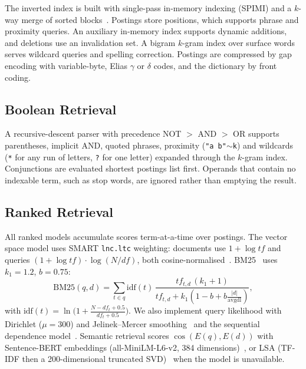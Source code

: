 \documentclass[conference]{IEEEtran}
\begin{document}
The inverted index is built with single-pass in-memory indexing (SPIMI) and a $k$-way merge of sorted blocks~\cite{manning2008}. Postings store positions, which supports phrase and proximity queries. An auxiliary in-memory index supports dynamic additions, and deletions use an invalidation set. A bigram $k$-gram index over surface words serves wildcard queries and spelling correction. Postings are compressed by gap encoding with variable-byte, Elias $\gamma$ or $\delta$ codes, and the dictionary by front coding.

\subsection{Boolean Retrieval}
A recursive-descent parser with precedence NOT $>$ AND $>$ OR supports parentheses, implicit AND, quoted phrases, proximity (\texttt{"a b"$\sim$k}) and wildcards (\texttt{*} for any run of letters, \texttt{?} for one letter) expanded through the $k$-gram index. Conjunctions are evaluated shortest postings list first. Operands that contain no indexable term, such as stop words, are ignored rather than emptying the result.

\subsection{Ranked Retrieval}
All ranked models accumulate scores term-at-a-time over postings. The vector space model uses SMART \texttt{lnc.ltc} weighting: documents use $1+\log tf$ and queries $(1+\log tf)\cdot\log(N/df)$, both cosine-normalised~\cite{salton1988}. BM25~\cite{robertson2009} uses $k_1=1.2$, $b=0.75$:
\begin{equation}
\mathrm{BM25}(q,d)=\sum_{t\in q}\mathrm{idf}(t)\,\frac{tf_{t,d}\,(k_1+1)}{tf_{t,d}+k_1\left(1-b+b\frac{|d|}{\mathrm{avgdl}}\right)},
\end{equation}
with $\mathrm{idf}(t)=\ln\!\big(1+\frac{N-df_t+0.5}{df_t+0.5}\big)$. We also implement query likelihood with Dirichlet ($\mu=300$) and Jelinek--Mercer smoothing~\cite{zhai2004} and the sequential dependence model~\cite{metzler2005}. Semantic retrieval scores $\cos(E(q),E(d))$ with Sentence-BERT embeddings (all-MiniLM-L6-v2, 384 dimensions)~\cite{reimers2019}, or LSA (TF-IDF then a 200-dimensional truncated SVD)~\cite{deerwester1990} when the model is unavailable.
\end{document}
